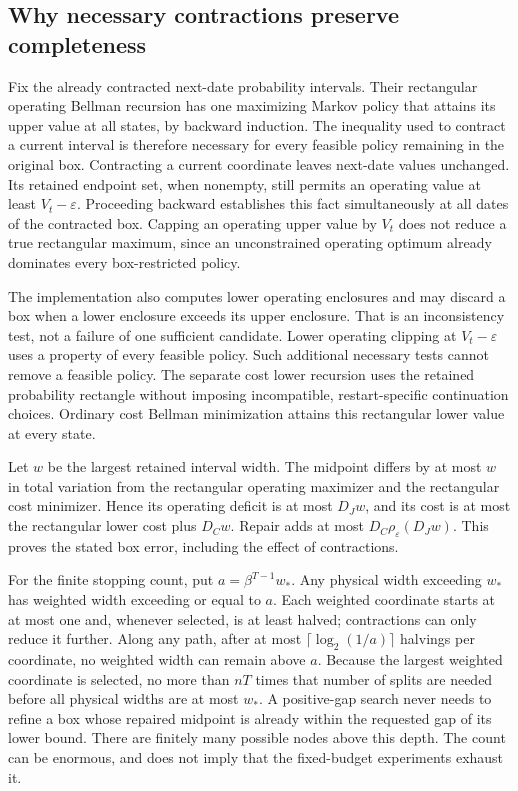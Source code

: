 \subsection{Why necessary contractions preserve completeness}
Fix the already contracted next-date probability intervals. Their rectangular operating Bellman recursion has one maximizing Markov policy that attains its upper value at all states, by backward induction. The inequality used to contract a current interval is therefore necessary for every feasible policy remaining in the original box. Contracting a current coordinate leaves next-date values unchanged. Its retained endpoint set, when nonempty, still permits an operating value at least $V_t-\varepsilon$. Proceeding backward establishes this fact simultaneously at all dates of the contracted box. Capping an operating upper value by $V_t$ does not reduce a true rectangular maximum, since an unconstrained operating optimum already dominates every box-restricted policy.

The implementation also computes lower operating enclosures and may discard a box when a lower enclosure exceeds its upper enclosure. That is an inconsistency test, not a failure of one sufficient candidate. Lower operating clipping at $V_t-\varepsilon$ uses a property of every feasible policy. Such additional necessary tests cannot remove a feasible policy. The separate cost lower recursion uses the retained probability rectangle without imposing incompatible, restart-specific continuation choices. Ordinary cost Bellman minimization attains this rectangular lower value at every state.

Let $w$ be the largest retained interval width. The midpoint differs by at most $w$ in total variation from the rectangular operating maximizer and the rectangular cost minimizer. Hence its operating deficit is at most $D_Jw$, and its cost is at most the rectangular lower cost plus $D_Cw$. Repair adds at most $D_C\rho_\varepsilon(D_Jw)$. This proves the stated box error, including the effect of contractions.

For the finite stopping count, put $a=\beta^{T-1}w_*$. Any physical width exceeding $w_*$ has weighted width exceeding or equal to $a$. Each weighted coordinate starts at at most one and, whenever selected, is at least halved; contractions can only reduce it further. Along any path, after at most $\lceil\log_2(1/a)\rceil$ halvings per coordinate, no weighted width can remain above $a$. Because the largest weighted coordinate is selected, no more than $nT$ times that number of splits are needed before all physical widths are at most $w_*$. A positive-gap search never needs to refine a box whose repaired midpoint is already within the requested gap of its lower bound. There are finitely many possible nodes above this depth. The count can be enormous, and does not imply that the fixed-budget experiments exhaust it.

